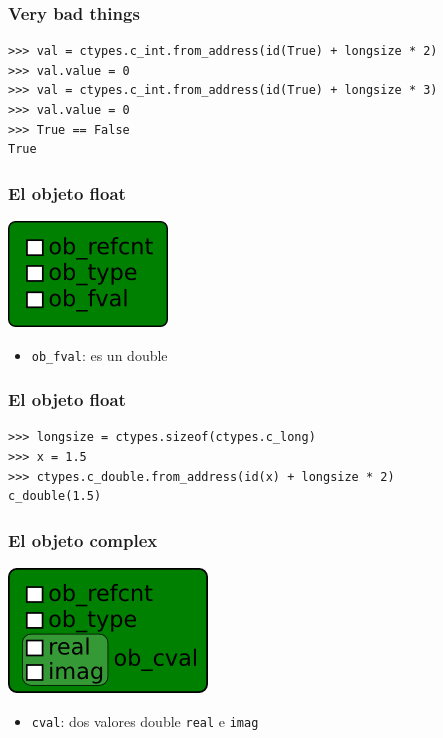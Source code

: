 \documentclass[10pt]{beamer}
\begin{document}
  \begin{frame}[containsverbatim]
    \frametitle{Very bad things}
    \begin{verbatim}
>>> val = ctypes.c_int.from_address(id(True) + longsize * 2)
>>> val.value = 0
>>> val = ctypes.c_int.from_address(id(True) + longsize * 3)
>>> val.value = 0
>>> True == False
True
    \end{verbatim}
  \end{frame}

  \begin{frame}[containsverbatim]
    \frametitle{El objeto float}
    \begin{center}\includegraphics{img/Float.png}\end{center}
    \begin{itemize}
      \item \verb+ob_fval+: es un double
    \end{itemize}
  \end{frame}

  \begin{frame}[containsverbatim]
    \frametitle{El objeto float}
    \begin{verbatim}
>>> longsize = ctypes.sizeof(ctypes.c_long)
>>> x = 1.5
>>> ctypes.c_double.from_address(id(x) + longsize * 2)
c_double(1.5)
    \end{verbatim}
  \end{frame}

  \begin{frame}[containsverbatim]
    \frametitle{El objeto complex}
    \begin{center}\includegraphics{img/Complex.png}\end{center}
    \begin{itemize}
      \item \verb+cval+: dos valores double \verb+real+ e \verb+imag+
    \end{itemize}
  \end{frame}
\end{document}
